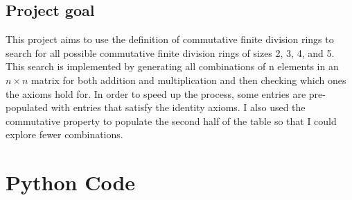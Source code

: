 \documentclass{article}
\begin{document}
\subsection{Project goal}
This project aims to use the definition of commutative finite division rings to search for all possible commutative finite division rings of sizes 2, 3, 4, and 5. This search is implemented
by generating all combinations of n elements in an $n \times n$ matrix for both addition and multiplication
and then checking which ones the axioms hold for. In order to speed up the process, some entries are pre-populated with entries that satisfy the identity axioms. I also used the commutative property to populate the second half of the table so that I could explore fewer combinations. 

\section{Python Code}
\end{document}
